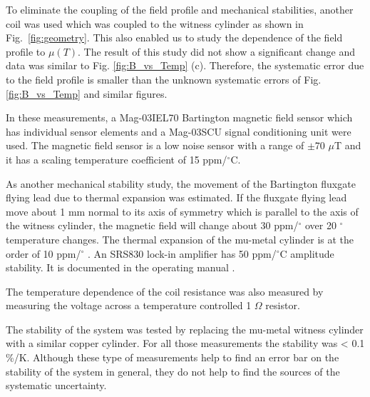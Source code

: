 \documentclass[review]{elsarticle}
\begin{document}
To eliminate the coupling of the field profile and mechanical stabilities, another coil was used which was coupled to the witness cylinder as shown in Fig.~\ref{fig:geometry}.  This also enabled us to
study the dependence of the field profile to $\mu(T)$. The result of this study did not show a significant change and data was similar to Fig. \ref{fig:B_vs_Temp} (c). Therefore, the systematic error due to the field profile is smaller than the unknown systematic errors of Fig. \ref{fig:B_vs_Temp} and similar figures.


In these measurements, a Mag-03IEL70 Bartington magnetic field sensor which has individual sensor elements and a Mag-03SCU signal conditioning unit were used.
The magnetic field sensor is a low noise sensor with a range of $\pm$70 $\mu$T and it has a scaling temperature coefficient of 15 ppm/$^{\circ}$C.


As another mechanical stability study, the movement of the Bartington fluxgate flying lead due to thermal expansion was estimated. If the fluxgate flying lead move about 1 mm normal to its axis of symmetry which is parallel to the axis of the witness cylinder, the magnetic field will change about 30 ppm/$^{\circ}$ over 20 $^{\circ}$ temperature changes.
The thermal expansion of the mu-metal cylinder is at the order of 10 ppm/$^{\circ}$ \cite{kruppvdm}.
An SRS830 lock-in amplifier has 50 ppm/$^\circ$C amplitude stability. It is documented in the operating manual \cite{bib:lockin}.

The temperature dependence of the coil resistance was also measured by measuring the voltage across a temperature controlled
1 $\Omega$ resistor.

The stability of the system was tested by replacing the mu-metal witness cylinder with a similar copper cylinder. For all those measurements the stability was < 0.1 \%/K. Although these type of measurements help to find an error bar on the stability of the system in general, they do not help to find the sources of the systematic uncertainty.
\end{document}
